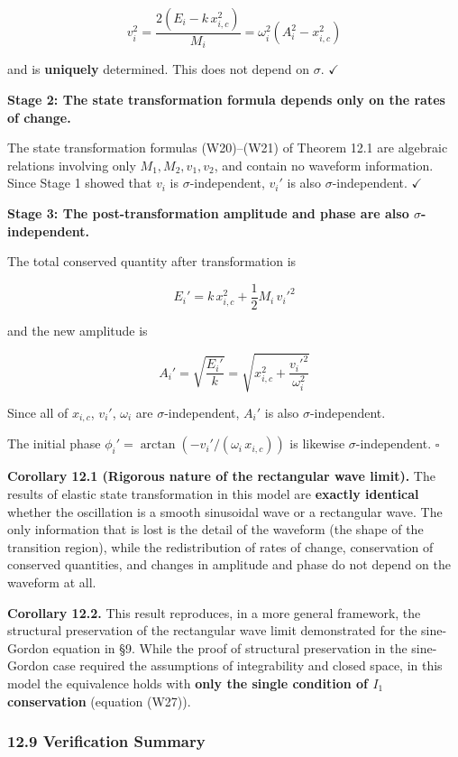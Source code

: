 \documentclass[a4paper,11pt]{article}
\begin{document}
\[v_i^2 = \frac{2(E_i - k\,x_{i,c}^2)}{M_i} = \omega_i^2(A_i^2 - x_{i,c}^2) \tag{W28}\]

and is \textbf{uniquely} determined. This does not depend on \(\sigma\).
\(\checkmark\)

\textbf{Stage 2: The state transformation formula depends only on the
rates of change.}

The state transformation formulas (W20)--(W21) of Theorem 12.1 are
algebraic relations involving only \(M_1, M_2, v_1, v_2\), and contain
no waveform information. Since Stage 1 showed that \(v_i\) is
\(\sigma\)-independent, \(v_i'\) is also \(\sigma\)-independent.
\(\checkmark\)

\textbf{Stage 3: The post-transformation amplitude and phase are also
\(\sigma\)-independent.}

The total conserved quantity after transformation is

\[E_i' = k\,x_{i,c}^2 + \frac{1}{2}M_i\,v_i'^2 \tag{W29}\]

and the new amplitude is

\[A_i' = \sqrt{\frac{E_i'}{k}} = \sqrt{x_{i,c}^2 + \frac{v_i'^2}{\omega_i^2}} \tag{W30}\]

Since all of \(x_{i,c}\), \(v_i'\), \(\omega_i\) are
\(\sigma\)-independent, \(A_i'\) is also \(\sigma\)-independent.

The initial phase \(\phi_i' = \arctan(-v_i'/(\omega_i\,x_{i,c}))\) is
likewise \(\sigma\)-independent. \(\square\)

\textbf{Corollary 12.1 (Rigorous nature of the rectangular wave limit).}
The results of elastic state transformation in this model are
\textbf{exactly identical} whether the oscillation is a smooth
sinusoidal wave or a rectangular wave. The only information that is lost
is the detail of the waveform (the shape of the transition region),
while the redistribution of rates of change, conservation of conserved
quantities, and changes in amplitude and phase do not depend on the
waveform at all.

\textbf{Corollary 12.2.} This result reproduces, in a more general
framework, the structural preservation of the rectangular wave limit
demonstrated for the sine-Gordon equation in §9. While the proof of
structural preservation in the sine-Gordon case required the assumptions
of integrability and closed space, in this model the equivalence holds
with \textbf{only the single condition of \(I_1\) conservation}
(equation (W27)).

\subsubsection{12.9 Verification Summary}\label{verification-summary}
\end{document}
